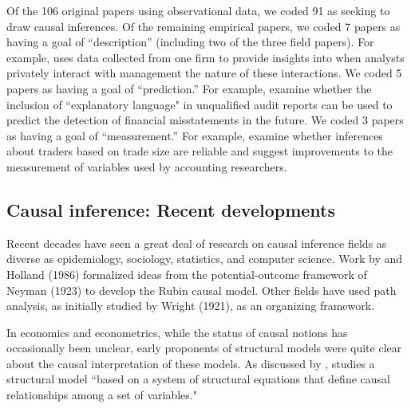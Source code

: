 \documentclass[11pt]{amsart}
\begin{document}
Of the 106 original papers using observational data, we coded 91 as seeking to draw causal inferences.
Of the remaining empirical papers, we coded 7 papers as having a goal of ``description'' (including two of the three field papers). 
For example, \citet{Soltes:2013ba} uses data collected from one firm to provide insights into when analysts privately interact with management the nature of these interactions.
We coded 5 papers as having a goal of ``prediction.'' 
For example, \citet{Czerney:2014bv} examine whether the inclusion of ``explanatory language" in unqualified audit reports can be used to predict the detection of financial misstatements in the future.
We coded 3 papers as having a goal of ``measurement.'' 
For example, \citet{Cready:2014ji} examine whether inferences about traders based on trade size are reliable and suggest improvements to the measurement of variables used by accounting researchers. 

\subsection{Causal inference: Recent developments}



Recent decades have seen a great deal of research on causal inference fields as diverse as epidemiology, sociology, statistics, and computer science. 
Work by \cite{Rubin:1974im,Rubin:1977dv} and Holland (1986) formalized ideas from the potential-outcome framework of Neyman (1923) to develop the Rubin causal model.
Other fields have used path analysis, as initially studied by Wright (1921), as an organizing framework.

In economics and econometrics, while the status of causal notions has occasionally been unclear, early proponents of structural models were quite clear about the causal interpretation of these models.
As discussed by \citep{Heckman:2015ez}, \citep{Haavelmo:1943cl,Haavelmo:1944jq} studies a structural model ``based on a system of structural equations that define causal relationships among a set of variables."
\end{document}
